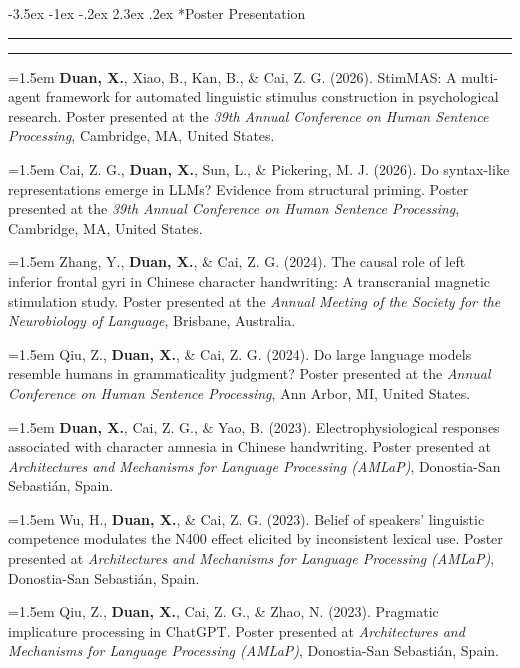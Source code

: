 \documentclass[11pt,a4paper]{article}
\makeatletter
\renewcommand\section{\@startsection{section}{1}{\z@}%
  {-3.5ex \@plus -1ex \@minus -.2ex}%
  {2.3ex \@plus.2ex}%
  {\normalfont\normalsize\bfseries}}
\makeatother
\begin{document}
\vspace{-1.2em} 
\section*{Poster Presentation}
\vspace{-.5em} 
\hrule
\vspace{0.3ex}
\hrule

\hangindent=1.5em  \textbf{Duan, X.}, Xiao, B., Kan, B., \& Cai, Z. G. (2026). StimMAS: A multi-agent framework for automated linguistic stimulus construction in psychological research. Poster presented at the \textit{39th Annual Conference on Human Sentence Processing}, Cambridge, MA, United States.

\hangindent=1.5em  Cai, Z. G., \textbf{Duan, X.}, Sun, L., \& Pickering, M. J. (2026). Do syntax-like representations emerge in LLMs? Evidence from structural priming. Poster presented at the \textit{39th Annual Conference on Human Sentence Processing}, Cambridge, MA, United States.

\hangindent=1.5em  Zhang, Y., \textbf{Duan, X.}, \& Cai, Z. G. (2024). The causal role of left inferior frontal gyri in Chinese character handwriting: A transcranial magnetic stimulation study. Poster presented at the \textit{Annual Meeting of the Society for the Neurobiology of Language}, Brisbane, Australia.

\hangindent=1.5em  Qiu, Z., \textbf{Duan, X.}, \& Cai, Z. G. (2024). Do large language models resemble humans in grammaticality judgment? Poster presented at the \textit{Annual Conference on Human Sentence Processing}, Ann Arbor, MI, United States.

\hangindent=1.5em  \textbf{Duan, X.}, Cai, Z. G., \& Yao, B. (2023). Electrophysiological responses associated with character amnesia in Chinese handwriting. Poster presented at \textit{Architectures and Mechanisms for Language Processing (AMLaP)}, Donostia-San Sebasti\'{a}n, Spain.

\hangindent=1.5em  Wu, H., \textbf{Duan, X.}, \& Cai, Z. G. (2023). Belief of speakers' linguistic competence modulates the N400 effect elicited by inconsistent lexical use. Poster presented at \textit{Architectures and Mechanisms for Language Processing (AMLaP)}, Donostia-San Sebasti\'{a}n, Spain.

\hangindent=1.5em  Qiu, Z., \textbf{Duan, X.}, Cai, Z. G., \& Zhao, N. (2023). Pragmatic implicature processing in ChatGPT. Poster presented at \textit{Architectures and Mechanisms for Language Processing (AMLaP)}, Donostia-San Sebasti\'{a}n, Spain.
\end{document}
